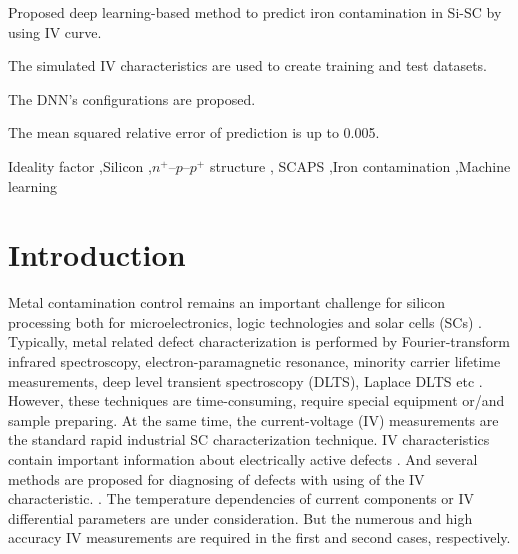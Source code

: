 \documentclass[a4paper,fleqn]{cas-sc}
\begin{document}

\begin{highlights}
\item Proposed deep learning-based method to predict iron contamination in Si-SC by using IV curve.
\item The simulated IV characteristics are used to create training and test datasets.
\item The DNN's configurations are proposed.
\item The mean squared relative error of prediction is up to 0.005.
\end{highlights}

\begin{keywords}
Ideality factor \sep Silicon \sep $n^+$--$p$--$p^+$ structure \sep
SCAPS \sep Iron contamination \sep Machine learning
\end{keywords}


\maketitle


\section{Introduction}

Metal  contamination control remains an important challenge for silicon processing both for microelectronics, logic technologies and solar cells (SCs) \citep{Claers2018,ZHU2016192,FeB:Schmidt,IronSC}.
Typically, metal related defect characterization is performed by Fourier-transform infrared spectroscopy,
electron-paramagnetic resonance,
minority carrier lifetime measurements,
deep level transient spectroscopy (DLTS),
Laplace DLTS etc \citep{Schroder2006,HowMuchPhysics,LaplDLTS}.
However, these techniques are time-consuming, require special equipment or/and sample preparing.
At the same time, the current-voltage (IV) measurements are the  standard  rapid industrial SC characterization technique.
IV characteristics contain important information about electrically active defects \citep{HowMuchPhysics,BulyarJAP}.
And several methods are proposed for diagnosing of defects with using of the IV characteristic.
\citep{HowMuchPhysics,BulyarJAP,BulyarSSE,Claeys2019,simoen2007}.
The temperature dependencies of current components \citep{Claeys2019,simoen2007}
or IV differential parameters \citep{BulyarJAP,BulyarSSE} are under consideration.
But the numerous and high accuracy IV measurements are required in the first and second cases, respectively.
\end{document}
